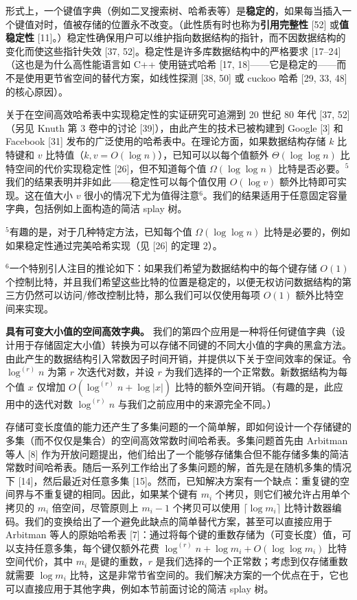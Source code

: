 \documentclass[12pt,a4paper]{ctexart}
\theoremstyle{remark}
\begin{document}
形式上，一个键值字典（例如二叉搜索树、哈希表等）是\textbf{稳定的}，如果每当插入一个键值对时，值被存储的位置永不改变。（此性质有时也称为\textbf{引用完整性} [52] 或\textbf{值稳定性} [11]。）稳定性确保用户可以维护指向数据结构的指针，而不因数据结构的变化而使这些指针失效 [37, 52]。稳定性是许多库数据结构中的严格要求 [17–24]（这也是为什么高性能语言如 C++ 使用链式哈希 [17, 18]——它是稳定的——而不是使用更节省空间的替代方案，如线性探测 [38, 50] 或 cuckoo 哈希 [29, 33, 48] 的核心原因）。

关于在空间高效哈希表中实现稳定性的实证研究可追溯到 20 世纪 80 年代 [37, 52]（另见 Knuth 第 3 卷中的讨论 [39]），由此产生的技术已被构建到 Google [3] 和 Facebook [31] 发布的广泛使用的哈希表中。在理论方面，如果数据结构存储 $k$ 比特键和 $v$ 比特值（$k,v=O(\log n)$），已知可以以每个值额外 $\Theta(\log\log n)$ 比特空间的代价实现稳定性 [26]，但不知道每个值 $\Omega(\log\log n)$ 比特是否必要。$^5$ 我们的结果表明并非如此——稳定性可以每个值仅用 $O(\log v)$ 额外比特即可实现。这在值大小 $v$ 很小的情况下尤为值得注意$^6$。我们的结果适用于任意固定容量字典，包括例如上面构造的简洁 splay 树。

$^5$有趣的是，对于几种特定方法，已知每个值 $\Omega(\log\log n)$ 比特是必要的，例如如果稳定性通过完美哈希实现（见 [26] 的定理 2）。

$^6$一个特别引人注目的推论如下：如果我们希望为数据结构中的每个键存储 $O(1)$ 个控制比特，并且我们希望这些比特的位置是稳定的，以便无权访问数据结构的第三方仍然可以访问/修改控制比特，那么我们可以仅使用每项 $O(1)$ 额外比特空间来实现。

\textbf{具有可变大小值的空间高效字典。} 我们的第四个应用是一种将任何键值字典（设计用于存储固定大小值）转换为可以存储不同键的不同大小值的字典的黑盒方法。由此产生的数据结构引入常数因子时间开销，并提供以下关于空间效率的保证。令 $\log^{(r)}n$ 为第 $r$ 次迭代对数，并设 $r$ 为我们选择的一个正常数。新数据结构为每个值 $x$ 仅增加 $O(\log^{(r)}n+\log|x|)$ 比特的额外空间开销。（有趣的是，此应用中的迭代对数 $\log^{(r)}n$ 与我们之前应用中的来源完全不同。）

存储可变长度值的能力还产生了多集问题的一个简单解，即如何设计一个存储键的多集（而不仅仅是集合）的空间高效常数时间哈希表。多集问题首先由 Arbitman 等人 [8] 作为开放问题提出，他们给出了一个能够存储集合但不能存储多集的简洁常数时间哈希表。随后一系列工作给出了多集问题的解，首先是在随机多集的情况下 [14]，然后最近对任意多集 [15]。然而，已知解决方案有一个缺点：重复键的空间界与不重复键的相同。因此，如果某个键有 $m_i$ 个拷贝，则它们被允许占用单个拷贝的 $m_i$ 倍空间，尽管原则上 $m_i-1$ 个拷贝可以使用 $\lceil\log m_i\rceil$ 比特计数器编码。我们的变换给出了一个避免此缺点的简单替代方案，甚至可以直接应用于 Arbitman 等人的原始哈希表 [7]：通过将每个键的重数存储为（可变长度）值，可以支持任意多集，每个键仅额外花费 $\log^{(r)}n+\log m_i+O(\log\log m_i)$ 比特空间代价，其中 $m_i$ 是键的重数，$r$ 是我们选择的一个正常数；考虑到仅存储重数就需要 $\log m_i$ 比特，这是非常节省空间的。我们解决方案的一个优点在于，它也可以直接应用于其他字典，例如本节前面讨论的简洁 splay 树。
\end{document}
